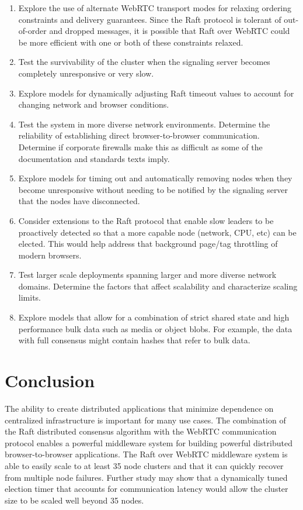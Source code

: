 \documentclass[conference,compsoc]{./IEEEtran/IEEEtran}
\begin{document}
\begin{enumerate}
\item Explore the use of alternate WebRTC transport modes for relaxing ordering constraints and delivery guarantees. Since the Raft protocol is tolerant of out-of-order and dropped messages, it is possible that Raft over WebRTC could be more efficient with one or both of these constraints relaxed.
\item Test the survivability of the cluster when the signaling server becomes completely unresponsive or very slow.
\item Explore models for dynamically adjusting Raft timeout values to account for changing network and browser conditions.
\item Test the system in more diverse network environments. Determine the reliability of establishing direct browser-to-browser communication.  Determine if corporate firewalls make this as difficult as some of the documentation and standards texts imply.
\item Explore models for timing out and automatically removing nodes when they become unresponsive without needing to be notified by the signaling server that the nodes have disconnected.
\item Consider extensions to the Raft protocol that enable slow leaders to be proactively detected so that a more capable node (network, CPU, etc) can be elected. This would help address that background page/tag throttling of modern browsers.
\item Test larger scale deployments spanning larger and more diverse network domains. Determine the factors that affect scalability and characterize scaling limits.
\item Explore models that allow for a combination of strict shared state and high performance bulk data such as media or object blobs. For example, the data with full consensus might contain hashes that refer to bulk data.
\end{enumerate}


\section{Conclusion}

The ability to create distributed applications that minimize dependence on centralized infrastructure is important for many use cases. The combination of the Raft distributed consensus algorithm with the WebRTC communication protocol enables a powerful middleware system for building powerful distributed browser-to-browser applications. The Raft over WebRTC middleware system is able to easily scale to at least 35 node clusters and that it can quickly recover from multiple node failures. Further study may show that a dynamically tuned election timer that accounts for communication latency would allow the cluster size to be scaled well beyond 35 nodes.
\end{document}
